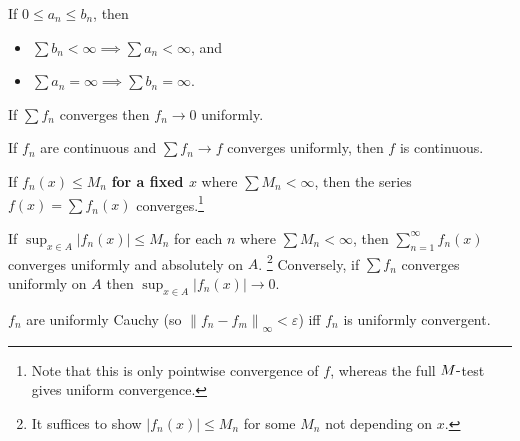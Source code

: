 \begin{proposition}

If \(0\leq a_n \leq b_n\), then

\begin{itemize}
\tightlist
\item
  \(\sum b_n < \infty \implies \sum a_n < \infty\), and
\item
  \(\sum a_n = \infty \implies \sum b_n = \infty\).
\end{itemize}

\end{proposition}

\begin{proposition}

If \(\sum f_n\) converges then \(f_n \to 0\) uniformly.

\end{proposition}

\begin{corollary}

If \(f_n\) are continuous and \(\sum f_n \to f\) converges uniformly,
then \(f\) is continuous.

\end{corollary}

\begin{proposition}

If \(f_n(x) \leq M_n\) \textbf{for a fixed \(x\)} where
\(\sum M_n < \infty\), then the series \(f(x) = \sum f_n(x)\)
converges.\footnote{Note that this is only pointwise convergence of
  \(f\), whereas the full \(M{\hbox{-}}\)test gives uniform convergence.}

\end{proposition}

\begin{proposition}

If \(\sup_{x\in A} {\left\lvert {f_n(x)} \right\rvert} \leq M_n\) for
each \(n\) where \(\sum M_n < \infty\), then
\(\sum_{n=1}^\infty f_n(x)\) converges uniformly and absolutely on
\(A\). \footnote{It suffices to show
  \({\left\lvert {f_n(x)} \right\rvert} \leq M_n\) for some \(M_n\) not
  depending on \(x\).} Conversely, if \(\sum f_n\) converges uniformly
on \(A\) then
\(\sup_{x\in A} {\left\lvert {f_n(x)} \right\rvert} \to 0\).

\end{proposition}

\begin{proposition}

\(f_n\) are uniformly Cauchy (so
\({\left\lVert {f_n - f_m} \right\rVert}_\infty < {\varepsilon}\)) iff
\(f_n\) is uniformly convergent.

\end{proposition}

